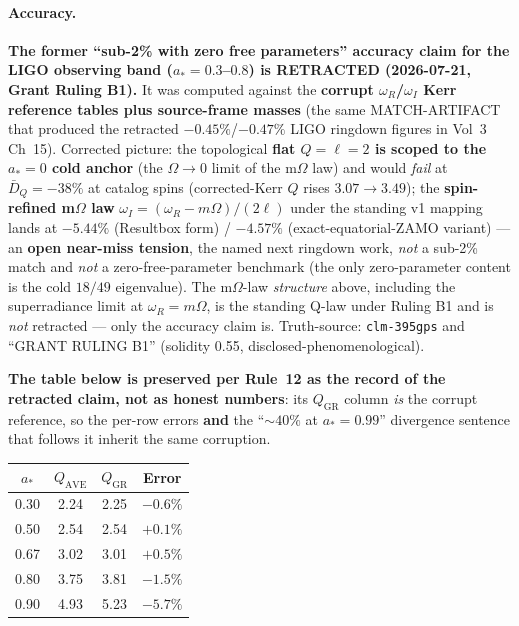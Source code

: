 \paragraph{Accuracy.}
\noindent\textbf{The former ``sub-2\% with zero free parameters'' accuracy claim for the LIGO observing
band ($a_* = 0.3$--$0.8$) is RETRACTED (2026-07-21, Grant Ruling B1).}  It was computed against the
\textbf{corrupt $\omega_R$/$\omega_I$ Kerr reference tables plus source-frame masses} (the same
MATCH-ARTIFACT that produced the retracted $-0.45\%$/$-0.47\%$ LIGO ringdown figures in Vol~3
Ch~15).  Corrected picture: the topological \textbf{flat $Q = \ell = 2$ is scoped to
the $a_* = 0$ cold anchor} (the $\Omega \to 0$ limit of the m$\Omega$ law) and would \emph{fail} at
$\bar D_Q = -38\%$ at catalog spins (corrected-Kerr $Q$ rises $3.07 \to 3.49$); the
\textbf{spin-refined m$\Omega$ law} $\omega_I = (\omega_R - m\Omega)/(2\ell)$ under the standing v1
mapping lands at \textbf{$-5.44\%$} (Resultbox form) / $-4.57\%$ (exact-equatorial-ZAMO variant) --- an
\textbf{open near-miss tension}, the named next ringdown work, \emph{not} a sub-2\% match and
\emph{not} a zero-free-parameter benchmark (the only zero-parameter content is the cold $18/49$
eigenvalue).  The m$\Omega$-law \emph{structure} above, including the superradiance limit at
$\omega_R = m\Omega$, is the standing Q-law under Ruling B1 and is \emph{not} retracted --- only the
accuracy claim is.  Truth-source:  \texttt{clm-395gps}
and 
``GRANT RULING B1'' (solidity 0.55, disclosed-phenomenological).

\noindent\textbf{The table below is preserved per Rule~12 as the record of the retracted claim, not as
honest numbers}: its $Q_\mathrm{GR}$ column \emph{is} the corrupt reference, so the per-row errors
\textbf{and} the ``$\sim\!40\%$ at $a_* = 0.99$'' divergence sentence that follows it inherit the same
corruption.

\begin{center}
\renewcommand{\arraystretch}{1.3}
\begin{tabular}{c c c c}
\toprule
$a_*$ & $Q_\mathrm{AVE}$ & $Q_\mathrm{GR}$ & Error \\
\midrule
0.30 & 2.24 & 2.25 & $-0.6\%$ \\
0.50 & 2.54 & 2.54 & $+0.1\%$ \\
0.67 & 3.02 & 3.01 & $+0.5\%$ \\
0.80 & 3.75 & 3.81 & $-1.5\%$ \\
0.90 & 4.93 & 5.23 & $-5.7\%$ \\
\bottomrule
\end{tabular}
\end{center}

